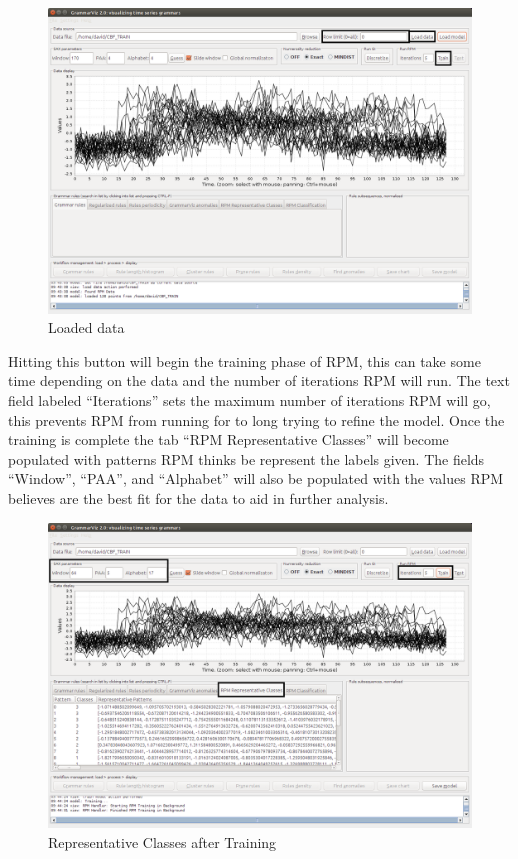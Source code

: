 \documentclass[letterpaper, 12pt]{article}
\begin{document}
\begin{figure}[H]
  \includegraphics[width=\textwidth]{TSAT-training-step-4}
  \caption{Loaded data}
  \label{fig:TSAT-training-step-4}
\end{figure}

\newpage
Hitting this button will begin the training phase of RPM, this can take some time depending on the data and the number of iterations RPM will run. The text field labeled ``Iterations'' sets the maximum number of iterations RPM will go, this prevents RPM from running for to long trying to refine the model. Once the training is complete the tab ``RPM Representative Classes'' will become populated with patterns RPM thinks be represent the labels given. The fields ``Window'', ``PAA'', and ``Alphabet'' will also be populated with the values RPM believes are the best fit for the data to aid in further analysis. 

\begin{figure}[H]
  \includegraphics[width=\textwidth]{TSAT-training-step-5}
  \caption{Representative Classes after Training}
  \label{fig:TSAT-training-step-5}
\end{figure}
\end{document}
